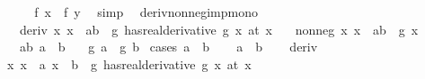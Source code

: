 \begin{isabellebody}
\ \ \isamarkupfalse%
\ \isamarkupfalse%
\ {\isachardoublequoteopen}f\ x\ {\isacharless}{\kern0pt}\ f\ y{\isachardoublequoteclose}\ \isamarkupfalse%
\ simp\isanewline
{}\isamarkupfalse%
%
\endisatagproof
{\isafoldproof}%
%
\isadelimproof
\isanewline
%
\endisadelimproof
\isanewline
{}\isamarkupfalse%
\ \ deriv{\isacharunderscore}{\kern0pt}nonneg{\isacharunderscore}{\kern0pt}imp{\isacharunderscore}{\kern0pt}mono{\isacharcolon}{\kern0pt}\isanewline
\ \ \ deriv{\isacharcolon}{\kern0pt}\ {\isachardoublequoteopen}{\isasymAnd}x{\isachardot}{\kern0pt}\ x\ {\isasymin}\ {\isacharbraceleft}{\kern0pt}a{\isachardot}{\kern0pt}{\isachardot}{\kern0pt}b{\isacharbraceright}{\kern0pt}\ {\isasymLongrightarrow}\ {\isacharparenleft}{\kern0pt}g\ has{\isacharunderscore}{\kern0pt}real{\isacharunderscore}{\kern0pt}derivative\ g{\isacharprime}{\kern0pt}\ x{\isacharparenright}{\kern0pt}\ {\isacharparenleft}{\kern0pt}at\ x{\isacharparenright}{\kern0pt}{\isachardoublequoteclose}\isanewline
\ \ \ nonneg{\isacharcolon}{\kern0pt}\ {\isachardoublequoteopen}{\isasymAnd}x{\isachardot}{\kern0pt}\ x\ {\isasymin}\ {\isacharbraceleft}{\kern0pt}a{\isachardot}{\kern0pt}{\isachardot}{\kern0pt}b{\isacharbraceright}{\kern0pt}\ {\isasymLongrightarrow}\ g{\isacharprime}{\kern0pt}\ x\ {\isasymge}\ {}{\isachardoublequoteclose}\isanewline
\ \ \ ab{\isacharcolon}{\kern0pt}\ {\isachardoublequoteopen}a\ {\isasymle}\ b{\isachardoublequoteclose}\isanewline
\ \ \ {\isachardoublequoteopen}g\ a\ {\isasymle}\ g\ b{\isachardoublequoteclose}\isanewline
%
\isadelimproof
%
\endisadelimproof
%
\isatagproof
{}\isamarkupfalse%
\ {\isacharparenleft}{\kern0pt}cases\ {\isachardoublequoteopen}a\ {\isacharless}{\kern0pt}\ b{\isachardoublequoteclose}{\isacharparenright}{\kern0pt}\isanewline
\ \ \isamarkupfalse%
\ {\isachardoublequoteopen}a\ {\isacharless}{\kern0pt}\ b{\isachardoublequoteclose}\isanewline
\ \ \isamarkupfalse%
\ deriv\ \isamarkupfalse%
\ {\isachardoublequoteopen}{\isasymAnd}x{\isachardot}{\kern0pt}\ {\isasymlbrakk}x\ {\isasymge}\ a{\isacharsemicolon}{\kern0pt}\ x\ {\isasymle}\ b{\isasymrbrakk}\ {\isasymLongrightarrow}\ {\isacharparenleft}{\kern0pt}g\ has{\isacharunderscore}{\kern0pt}real{\isacharunderscore}{\kern0pt}derivative\ g{\isacharprime}{\kern0pt}\ x{\isacharparenright}{\kern0pt}\ {\isacharparenleft}{\kern0pt}at\ x{\isacharparenright}{\kern0pt}{\isachardoublequoteclose}\ \isamarkupfalse%

\end{isabellebody}
